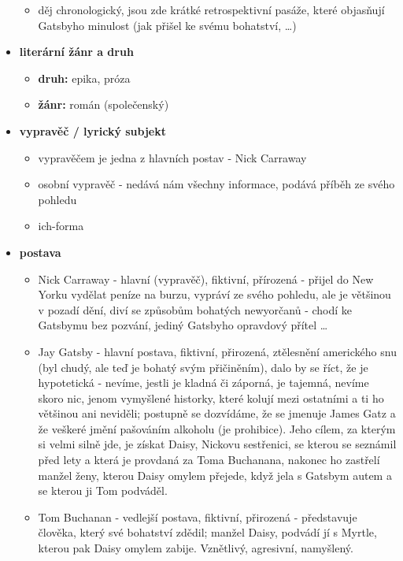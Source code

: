 \documentclass[11pt]{article}
\begin{document}
\begin{itemize}
\begin{itemize}
            \item děj chronologický, jsou zde krátké retrospektivní pasáže, které objasňují Gatsbyho minulost (jak přišel ke svému bohatství, \dots)
        \end{itemize}
        \item\textbf{literární žánr a druh}
        \begin{itemize}
            \item\textbf{druh: }epika, próza
            \item\textbf{žánr: }román (společenský)
        \end{itemize}
        \item\textbf{vypravěč / lyrický subjekt}
        \begin{itemize}
            \item vypravěčem je jedna z hlavních postav - Nick Carraway
            \item osobní vypravěč - nedává nám všechny informace, podává příběh ze svého pohledu
            \item ich-forma
        \end{itemize}
        \item\textbf{postava}
        \begin{itemize}
            \item Nick Carraway - hlavní (vypravěč), fiktivní, přírozená - přijel do New Yorku vydělat peníze na burzu, vypráví ze svého pohledu, ale je většinou v pozadí dění, diví se způsobům bohatých newyorčanů - chodí ke Gatsbymu bez pozvání, jediný Gatsbyho opravdový přítel \dots
            \item Jay Gatsby - hlavní postava, fiktivní, přirozená, ztělesnění amerického snu (byl chudý, ale teď je bohatý svým přičiněním), dalo by se říct, že je hypotetická - nevíme, jestli je kladná či záporná, je tajemná, nevíme skoro nic, jenom vymyšlené historky, které kolují mezi ostatními a ti ho většinou ani neviděli; postupně se dozvídáme, že se jmenuje James Gatz a že veškeré jmění pašováním alkoholu (je prohibice). Jeho cílem, za kterým si velmi silně jde, je získat Daisy, Nickovu sestřenici, se kterou se seznámil před lety a která je provdaná za Toma Buchanana, nakonec ho zastřelí manžel ženy, kterou Daisy omylem přejede, když jela s Gatsbym autem a se kterou ji Tom podváděl.
            \item Tom Buchanan - vedlejší postava, fiktivní, přirozená - představuje člověka, který své bohatství zdědil; manžel Daisy, podvádí jí s Myrtle, kterou pak Daisy omylem zabije. Vznětlivý, agresivní, namyšlený.

\end{itemize}
\end{itemize}
\end{document}
